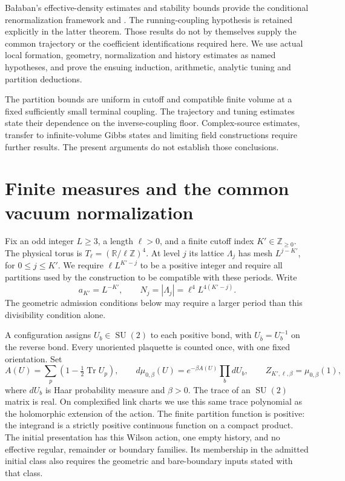 \documentclass[11pt,letterpaper,reqno]{amsart}
\numberwithin{equation}{section}
\theoremstyle{definition}
\theoremstyle{remark}
\begin{document}
Ba\l aban's effective-density estimates and stability bounds
provide the conditional renormalization framework
\cite[Theorem~2 and Corollary~3, pp.~263--264]{Bal88} and
\cite[Theorem~1 and (0.1), pp.~355--356]{Bal89}.
The running-coupling hypothesis is retained explicitly in the
latter theorem. Those results do not by themselves supply the
common trajectory or the coefficient identifications required
here. We use actual local formation, geometry, normalization and
history estimates as named hypotheses, and prove the ensuing
induction, arithmetic, analytic tuning and partition deductions.

The partition bounds are uniform in cutoff and compatible finite
volume at a fixed sufficiently small terminal coupling. The trajectory
and tuning estimates state their dependence on the inverse-coupling floor. Complex-source estimates, transfer to infinite-volume
Gibbs states and limiting field constructions require further
results. The present arguments do not establish those conclusions.

\section{Finite measures and the common vacuum normalization}
\label{rt:sec-normalization}

Fix an odd integer $L\ge3$, a length $\ell>0$, and a finite
cutoff index $K'\in\mathbb Z_{\ge0}$.
The physical torus is $T_\ell=(\mathbb R/\ell\mathbb Z)^4$.
At level $j$ its lattice $\Lambda_j$ has mesh $L^{j-K'}$, for
$0\le j\le K'$. We require $\ell L^{K'-j}$ to be a positive integer and
require all partitions used by the construction to be compatible
with these periods. Write
\[
 a_{K'}=L^{-K'},\qquad
 N_j=|\Lambda_j|=\ell^4L^{4(K'-j)}.
\]
The geometric admission conditions below may require a larger
period than this divisibility condition alone.

A configuration assigns $U_b\in\operatorname{SU}(2)$ to each
positive bond, with $U_{\bar b}=U_b^{-1}$ on the reverse bond.
Every unoriented plaquette is counted once, with one fixed
orientation. Set
\begin{equation}\label{rt:eq-wilson-measure}
 A(U)=\sum_p\left(1-\tfrac12\operatorname{Tr}U_p\right),
 \qquad d\mu_{0,\beta}(U)=e^{-\beta A(U)}\prod_b dU_b,
 \qquad Z_{K',\ell,\beta}=\mu_{0,\beta}(1),
\end{equation}
where $dU_b$ is Haar probability measure and $\beta>0$.
The trace of an $\operatorname{SU}(2)$ matrix is real. On complexified
link charts we use this same trace polynomial as the holomorphic
extension of the action.
The finite partition function is positive: the integrand is a
strictly positive continuous function on a compact product.
The initial presentation has this Wilson action, one empty history,
and no effective regular, remainder or boundary families. Its
membership in the admitted initial class also requires the
geometric and bare-boundary inputs stated with that class.
\end{document}
